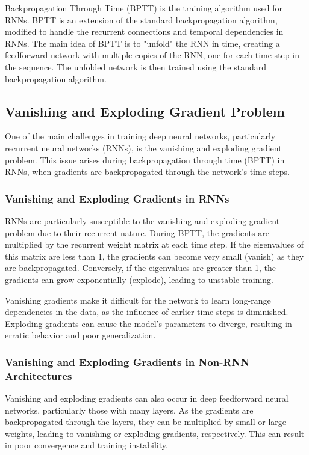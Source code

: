 \documentclass[12pt]{article}
\begin{document}
Backpropagation Through Time (BPTT) is the training algorithm used for RNNs. BPTT is an extension of the standard backpropagation algorithm, modified to handle the recurrent connections and temporal dependencies in RNNs. The main idea of BPTT is to "unfold" the RNN in time, creating a feedforward network with multiple copies of the RNN, one for each time step in the sequence. The unfolded network is then trained using the standard backpropagation algorithm.

\subsection{Vanishing and Exploding Gradient Problem}

One of the main challenges in training deep neural networks, particularly recurrent neural networks (RNNs), is the vanishing and exploding gradient problem. This issue arises during backpropagation through time (BPTT) in RNNs, when gradients are backpropagated through the network's time steps.

\subsubsection{Vanishing and Exploding Gradients in RNNs}

RNNs are particularly susceptible to the vanishing and exploding gradient problem due to their recurrent nature. During BPTT, the gradients are multiplied by the recurrent weight matrix at each time step. If the eigenvalues of this matrix are less than 1, the gradients can become very small (vanish) as they are backpropagated. Conversely, if the eigenvalues are greater than 1, the gradients can grow exponentially (explode), leading to unstable training.

Vanishing gradients make it difficult for the network to learn long-range dependencies in the data, as the influence of earlier time steps is diminished. Exploding gradients can cause the model's parameters to diverge, resulting in erratic behavior and poor generalization.

\subsubsection{Vanishing and Exploding Gradients in Non-RNN Architectures}

Vanishing and exploding gradients can also occur in deep feedforward neural networks, particularly those with many layers. As the gradients are backpropagated through the layers, they can be multiplied by small or large weights, leading to vanishing or exploding gradients, respectively. This can result in poor convergence and training instability.
\end{document}
